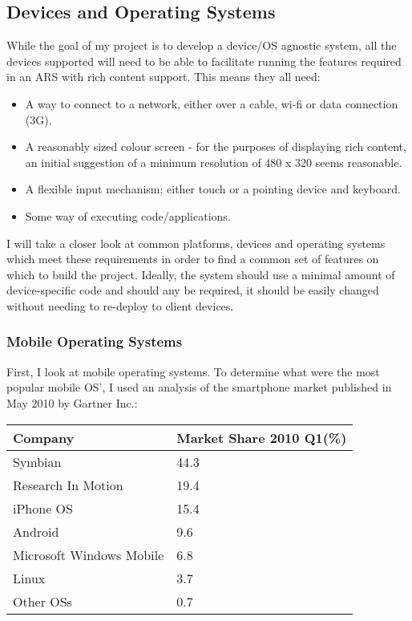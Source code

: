 \documentclass[a4papert,11pt,notitlepage]{ltxdoc}
\begin{document}
\subsection{Devices and Operating Systems}
While the goal of my project is to develop a device/OS agnostic system, all the devices supported will need to be able to facilitate running the features required in an ARS with rich content support. This means they all need:
\begin{itemize}
\item A way to connect to a network, either over a cable, wi-fi or data connection (3G).
\item A reasonably sized colour screen - for the purposes of displaying rich content, an initial suggestion of a minimum resolution of 480 x 320 seems reasonable.
\item A flexible input mechanism; either touch or a pointing device and keyboard.
\item Some way of executing code/applications.
\end{itemize}

I will take a closer look at common platforms, devices and operating systems which meet these requirements in order to find a common set of features on which to build the project. Ideally, the system should use a minimal amount of device-specific code and should any be required, it should be easily changed without needing to re-deploy to client devices.

\subsubsection{Mobile Operating Systems}
First, I look at mobile operating systems. To determine what were the most popular mobile OS', I used an analysis of the smartphone market published in May 2010 by Gartner Inc.\cite{gartner:mobile}:

\begin{tabular}{l l}
Company & Market Share 2010 Q1(\%) \\
\hline
Symbian & 44.3 \\
Research In Motion & 19.4 \\
iPhone OS & 15.4 \\
Android & 9.6 \\
Microsoft Windows Mobile & 6.8 \\
Linux & 3.7 \\
Other OSs & 0.7 \\
\end{tabular}
\end{document}
